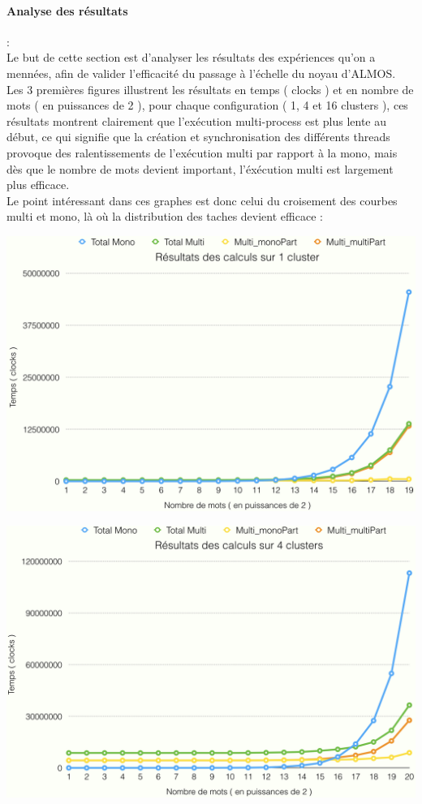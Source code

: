 \paragraph{Analyse des résultats}:\\

Le but de cette section est d'analyser les résultats des expériences qu'on a mennées, afin de valider l'efficacité du passage à l'échelle du noyau d'ALMOS.\\
Les 3 premières figures illustrent les résultats en temps ( clocks ) et en nombre de mots ( en puissances de 2 ), pour chaque configuration ( 1, 4 et 16 clusters ), ces résultats montrent clairement que l'exécution multi-process est plus lente au début, ce qui signifie que la création et synchronisation des différents threads provoque des ralentissements de l'exécution multi par rapport à la mono, mais dès que le nombre de mots devient important, l'éxécution multi est largement plus efficace.\\
Le point intéressant dans ces graphes est donc celui du croisement des courbes multi et mono, là où la distribution des taches devient efficace :

\begin{center}
\includegraphics[scale=0.4]{images/graph_1.png}
\end{center}

\begin{center}
\includegraphics[scale=0.4]{images/graph_4.png}
\end{center}

